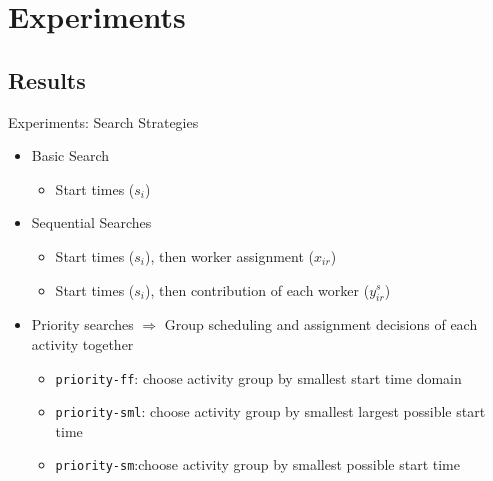\documentclass{beamer}
\begin{document}
\section{Experiments}

\subsection{Results}
\begin{frame}{Experiments: Search Strategies}
	\begin{itemize}
		\item Basic Search
		\begin{itemize}
			\item  Start times ($s_i$)
		\end{itemize}\pause
			\vspace{2mm}
		\item Sequential Searches
		\begin{itemize}
			\item  Start times ($s_i$), then worker assignment ($x_{ir}$)
			\item  Start times ($s_i$), then contribution of each worker ($y_{ir}^s$)
		\end{itemize}\pause
			\vspace{2mm}
		\item Priority searches $\Rightarrow$ Group scheduling and assignment decisions of each activity together
		\begin{itemize}
			\item {\tt priority-ff}: choose activity group by smallest start time domain 
			\item {\tt priority-sml}: choose activity group by smallest largest possible start time
			\item {\tt priority-sm}:choose activity group by smallest possible start time
		\end{itemize}
	\end{itemize}
\end{frame}
\end{document}

